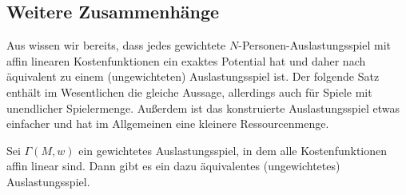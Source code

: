 \subsection{Weitere Zusammenhänge}


Aus  wissen wir bereits, dass jedes gewichtete $N$-Personen-Auslastungsspiel mit affin linearen Kostenfunktionen ein exaktes Potential hat und daher nach  äquivalent zu einem (ungewichteten) Auslastungsspiel ist. Der folgende Satz enthält im Wesentlichen die gleiche Aussage, allerdings auch für Spiele mit unendlicher Spielermenge. Außerdem ist das konstruierte Auslastungsspiel etwas einfacher und hat im Allgemeinen eine kleinere Ressourcenmenge.

\begin{satz}\label{satz:GewAuslZuUngewAusl}
	Sei $\Gamma(M,w)$ ein gewichtetes Auslastungsspiel, in dem alle Kostenfunktionen affin linear sind. Dann gibt es ein dazu äquivalentes (ungewichtetes) Auslastungsspiel. 
\end{satz}

